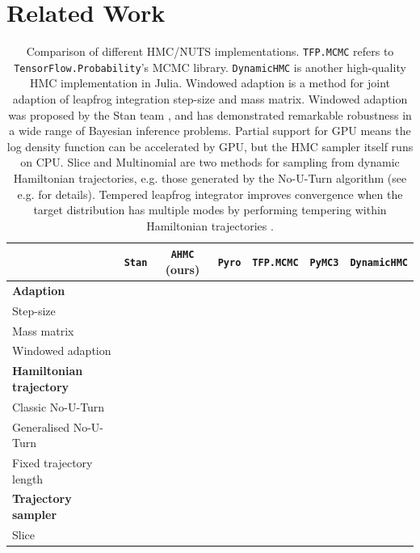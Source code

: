 \documentclass[tablecaption=bottom,wcp]{jmlr} %
\newcommand{\cmark}{\color{forestgreen}{\ding{51}}}
\newcommand{\xmark}{\color{red}{\ding{55}}}
\begin{document}
\section{Related Work}
\begin{table}[htbp]
\label{tb:related-work}
    \floatconts
    {}
    {\caption{Comparison of different HMC/NUTS implementations. \texttt{TFP.MCMC} refers to \texttt{TensorFlow.Probability}'s MCMC library. \texttt{DynamicHMC} is another high-quality HMC implementation in Julia. Windowed adaption is a method for joint adaption of leapfrog integration step-size and mass matrix. Windowed adaption was proposed by the Stan team \citep{carpenter2017stan}, and has demonstrated remarkable robustness in a wide range of Bayesian inference problems. Partial support for GPU means the log density function can be accelerated by GPU, but the HMC sampler itself runs on CPU. Slice and Multinomial are two methods for sampling from dynamic Hamiltonian trajectories, e.g. those generated by the No-U-Turn algorithm (see e.g. \citet{betancourt2017conceptual} for details). Tempered leapfrog integrator improves convergence when the target distribution has multiple modes by performing tempering within Hamiltonian trajectories \citep{neal2011mcmc}.}}
    {
    \begin{tabular}{l|cccccc}
    & \texttt{Stan} & \texttt{AHMC} (ours) & \texttt{Pyro} & \texttt{TFP.MCMC} & \texttt{PyMC3} & \texttt{DynamicHMC} \\
    \hline
    \textbf{Adaption} \\
    Step-size & \cmark  & \cmark & \cmark & \cmark & \cmark &\cmark \\
    Mass matrix & \cmark & \cmark & \cmark & \cmark & \cmark &\cmark \\
    Windowed adaption & \cmark & \cmark & \xmark & \xmark & \xmark & \cmark\\
    \hline
    \textbf{Hamiltonian trajectory} \\
    Classic No-U-Turn & \cmark & \cmark & \xmark & \cmark & \xmark &\xmark \\
    Generalised No-U-Turn & \cmark & \cmark & \cmark & \cmark & \cmark &\cmark \\
    Fixed trajectory length& \cmark & \cmark & \cmark & \cmark & \cmark & \xmark\\
    \hline
    \textbf{Trajectory sampler} \\
    Slice & \cmark & \cmark & \cmark & \cmark & \xmark &\xmark \\

\end{tabular}}
\end{table}
\end{document}
